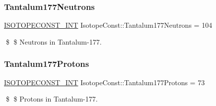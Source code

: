 \subsubsection{\texorpdfstring{Tantalum177\+Neutrons}{Tantalum177Neutrons}}
{\footnotesize\ttfamily \mbox{\hyperlink{group___isotope_const-_macros_ga5f18360b3e99483a35c32d789e62621c}{I\+S\+O\+T\+O\+P\+E\+C\+O\+N\+S\+T\+\_\+\+I\+NT}} Isotope\+Const\+::\+Tantalum177\+Neutrons = 104}

\$ \$ Neutrons in Tantalum-\/177. \mbox{\label{group___isotope_const-_tantalum-_ta177_ga95c05c5f88e604a1634aa3a6477d0a42}} 
\subsubsection{\texorpdfstring{Tantalum177\+Protons}{Tantalum177Protons}}
{\footnotesize\ttfamily \mbox{\hyperlink{group___isotope_const-_macros_ga5f18360b3e99483a35c32d789e62621c}{I\+S\+O\+T\+O\+P\+E\+C\+O\+N\+S\+T\+\_\+\+I\+NT}} Isotope\+Const\+::\+Tantalum177\+Protons = 73}

\$ \$ Protons in Tantalum-\/177. 